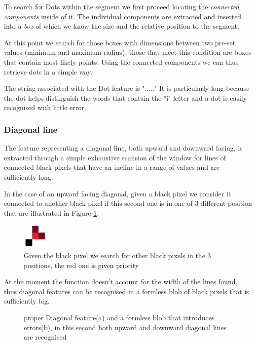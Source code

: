 To search for Dots within the segment we first proceed locating the \emph{connected components} inside of it. The individual components are extracted and inserted into a \emph{box} of which we know the size and the relative position to the segment.


At this point we search for those boxes with dimensions between two pre-set values (minimum and maximum radius), those that meet this condition are boxes that contain most likely points.
Using the connected components we can thus retrieve dots in a simple way.

The string associated with the Dot feature is "....."
It is particularly long because the dot helps distinguish the words that contain the "i" letter and a dot is easily recognised with little error.

\subsubsection{Diagonal line}

The feature representing a diagonal line, both upward and downward facing, is extracted through a simple exhaustive scansion of the window for lines of connected black pixels that have an incline in a range of values and are sufficiently long.

In the case of an upward facing diagonal, given a black pixel we consider it connected to another black pixel if this second one is in one of 3 different position that are illustrated in Figure \ref{pixels}.

\begin{figure}[!htpb]
\centering
\includegraphics[width=0.12\textwidth]{images/diagP.jpg}
\caption{Given the black pixel we search for other black pixels in the 3 positions, the red one is given priority}
\label{pixels}
\end{figure} 
\vspace{3mm}
At the moment the function doesn't account for the width of the lines found, thus diagonal features can be recognised in a formless blob of black pixels that is sufficiently big. 

\begin{figure}[!htpb]
 \centering
 \hspace{15mm}
 \caption{proper Diagonal feature(a) and a formless blob that introduces errors(b), in this second both upward and downward diagonal lines are recognised}
  \end{figure}
\vspace{2mm}
   
